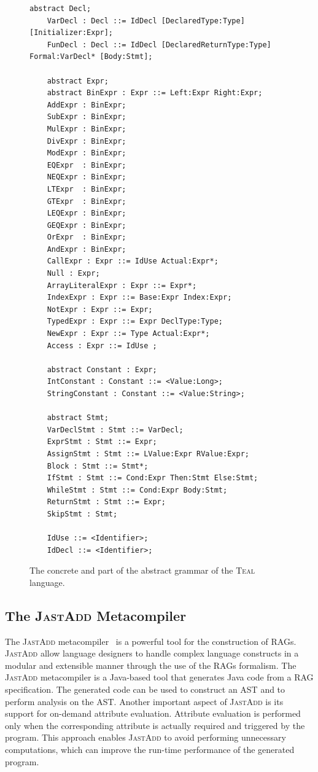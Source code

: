 \begin{figure}[H]
\begin{minipage}{0.8\textwidth}
\begin{lrbox}{\mylistingbox}
\begin{lstlisting}[language=ASTGrammar]
    abstract Decl;
    VarDecl : Decl ::= IdDecl [DeclaredType:Type] [Initializer:Expr];
    FunDecl : Decl ::= IdDecl [DeclaredReturnType:Type] Formal:VarDecl* [Body:Stmt];

    abstract Expr;
    abstract BinExpr : Expr ::= Left:Expr Right:Expr;
    AddExpr : BinExpr;
    SubExpr : BinExpr;
    MulExpr : BinExpr;
    DivExpr : BinExpr;
    ModExpr : BinExpr;
    EQExpr  : BinExpr;
    NEQExpr : BinExpr;
    LTExpr  : BinExpr;
    GTExpr  : BinExpr;
    LEQExpr : BinExpr;
    GEQExpr : BinExpr;
    OrExpr  : BinExpr;
    AndExpr : BinExpr;
    CallExpr : Expr ::= IdUse Actual:Expr*;
    Null : Expr;
    ArrayLiteralExpr : Expr ::= Expr*;
    IndexExpr : Expr ::= Base:Expr Index:Expr;
    NotExpr : Expr ::= Expr;
    TypedExpr : Expr ::= Expr DeclType:Type;
    NewExpr : Expr ::= Type Actual:Expr*;
    Access : Expr ::= IdUse ;

    abstract Constant : Expr;
    IntConstant : Constant ::= <Value:Long>;
    StringConstant : Constant ::= <Value:String>;

    abstract Stmt;
    VarDeclStmt : Stmt ::= VarDecl;
    ExprStmt : Stmt ::= Expr;
    AssignStmt : Stmt ::= LValue:Expr RValue:Expr;
    Block : Stmt ::= Stmt*;
    IfStmt : Stmt ::= Cond:Expr Then:Stmt Else:Stmt;
    WhileStmt : Stmt ::= Cond:Expr Body:Stmt;
    ReturnStmt : Stmt ::= Expr;
    SkipStmt : Stmt;

    IdUse ::= <Identifier>;
    IdDecl ::= <Identifier>;
        \end{lstlisting}
\end{lrbox}
\scalebox{0.75}{\usebox{\mylistingbox}}

        \end{minipage}
\caption{\label{fig:tealGrammar} The concrete and part of the abstract grammar of the \textsc{Teal} language.}
\end{figure}


\subsection{The \textsc{JastAdd} Metacompiler}
\label{sec:jastadd}
The \textsc{JastAdd} metacompiler~\cite{DBLP:journals/entcs/HedinM01} is a powerful tool for the construction of
RAGs.
\textsc{JastAdd} allow language designers to  handle complex language constructs in a modular and extensible
manner through the use of the RAGs formalism.
The \textsc{JastAdd} metacompiler is a Java-based tool that generates
Java code from a RAG specification. The generated code can be used to construct an AST and to perform
analysis on the AST.
Another important aspect of \textsc{JastAdd} is its support for on-demand attribute evaluation.
Attribute evaluation is performed only when the corresponding
attribute is actually required and triggered by the program. This approach enables \textsc{JastAdd} to
avoid performing unnecessary computations, which can improve the run-time
performance of the generated program.

